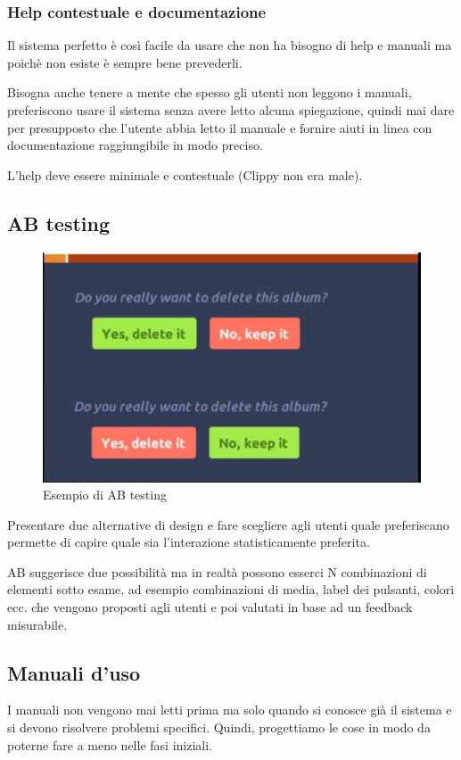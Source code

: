 \documentclass[11pt,a4paper]{book}
\begin{document}
\subsubsection{Help contestuale e documentazione}
Il sistema perfetto è così facile da usare che non ha bisogno di help e manuali ma poichè non esiste è sempre bene prevederli.

Bisogna anche tenere a mente che spesso gli utenti non leggono i manuali, preferiscono usare il sistema senza avere letto alcuna spiegazione, quindi mai dare per presupposto che l'utente abbia letto il manuale e fornire aiuti in linea con documentazione raggiungibile in modo preciso.

L'help deve essere minimale e contestuale (Clippy non era male).


\subsection{AB testing}
\begin{figure}[h!]
	\begin{center}
		\includegraphics[scale=0.6]{img/019.jpg}
		\caption{Esempio di AB testing}
		\label{fig: 019}
	\end{center}
\end{figure}
Presentare due alternative di design e fare scegliere agli utenti quale preferiscano permette di capire quale sia l'interazione statisticamente preferita.

AB suggerisce due possibilità ma in realtà possono esserci N combinazioni di elementi sotto esame, ad esempio combinazioni di media, label dei pulsanti, colori ecc. che vengono proposti agli utenti e poi valutati in base ad un feedback misurabile.

\subsection{Manuali d'uso}
I manuali non vengono mai letti prima ma solo quando si conosce già il sistema e si devono risolvere problemi specifici. Quindi, progettiamo le cose in modo da poterne fare a meno nelle fasi iniziali.
\end{document}
